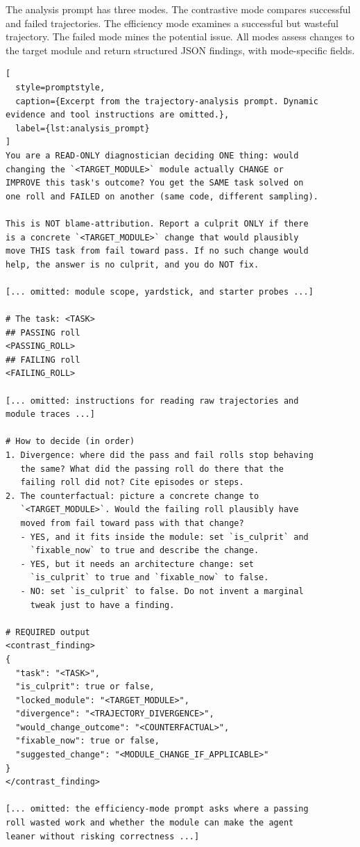 \documentclass{article} %
\begin{document}
The analysis prompt has three modes. The contrastive mode compares successful
and failed trajectories. The efficiency mode examines a successful but
wasteful trajectory. 
The failed mode mines the potential issue.
All modes assess changes to the target module and return structured JSON findings, with mode-specific fields.

\begin{lstlisting}[
  style=promptstyle,
  caption={Excerpt from the trajectory-analysis prompt. Dynamic evidence and tool instructions are omitted.},
  label={lst:analysis_prompt}
]
You are a READ-ONLY diagnostician deciding ONE thing: would
changing the `<TARGET_MODULE>` module actually CHANGE or
IMPROVE this task's outcome? You get the SAME task solved on
one roll and FAILED on another (same code, different sampling).

This is NOT blame-attribution. Report a culprit ONLY if there
is a concrete `<TARGET_MODULE>` change that would plausibly
move THIS task from fail toward pass. If no such change would
help, the answer is no culprit, and you do NOT fix.

[... omitted: module scope, yardstick, and starter probes ...]

# The task: <TASK>
## PASSING roll
<PASSING_ROLL>
## FAILING roll
<FAILING_ROLL>

[... omitted: instructions for reading raw trajectories and
module traces ...]

# How to decide (in order)
1. Divergence: where did the pass and fail rolls stop behaving
   the same? What did the passing roll do there that the
   failing roll did not? Cite episodes or steps.
2. The counterfactual: picture a concrete change to
   `<TARGET_MODULE>`. Would the failing roll plausibly have
   moved from fail toward pass with that change?
   - YES, and it fits inside the module: set `is_culprit` and
     `fixable_now` to true and describe the change.
   - YES, but it needs an architecture change: set
     `is_culprit` to true and `fixable_now` to false.
   - NO: set `is_culprit` to false. Do not invent a marginal
     tweak just to have a finding.

# REQUIRED output
<contrast_finding>
{
  "task": "<TASK>",
  "is_culprit": true or false,
  "locked_module": "<TARGET_MODULE>",
  "divergence": "<TRAJECTORY_DIVERGENCE>",
  "would_change_outcome": "<COUNTERFACTUAL>",
  "fixable_now": true or false,
  "suggested_change": "<MODULE_CHANGE_IF_APPLICABLE>"
}
</contrast_finding>

[... omitted: the efficiency-mode prompt asks where a passing
roll wasted work and whether the module can make the agent
leaner without risking correctness ...]
\end{lstlisting}
\end{document}
